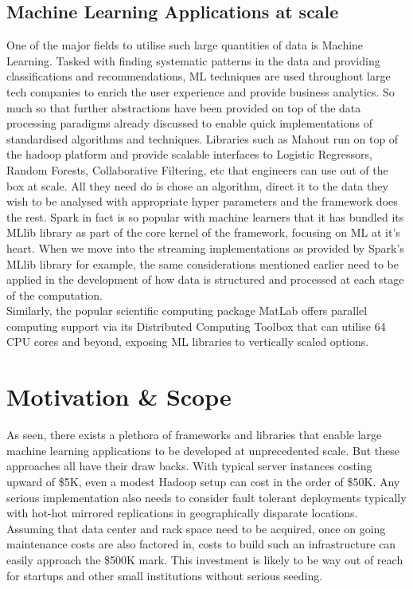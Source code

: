 \documentclass[a4paper,11pt]{scrreprt}
\begin{document}
\section{Machine Learning Applications at scale}
One of the major fields to utilise such large quantities of data is Machine Learning. Tasked with finding systematic patterns in the data and providing classifications and recommendations, ML techniques are used throughout large tech companies to enrich the user experience and provide business analytics. So much so that further abstractions have been provided on top of the data processing paradigms already discussed to enable quick implementations of standardised algorithms and techniques. Libraries such as Mahout\cite{mahout-site} run on top of the hadoop platform and provide scalable interfaces to Logistic Regressors, Random Forests, Collaborative Filtering, etc that engineers can use out of the box at scale. All they need do is chose an algorithm, direct it to the data they wish to be analysed with appropriate hyper parameters and the framework does the rest. Spark in fact is so popular with machine learners that it has bundled its MLlib library as part of the core kernel of the framework, focusing on ML at it's heart. When we move into the streaming implementations as provided by Spark's MLlib library for example, the same considerations mentioned earlier need to be applied in the development of how data is structured and processed at each stage of the computation.\\

Similarly, the popular scientific computing package MatLab offers parallel computing support via its Distributed Computing Toolbox that can utilise 64 CPU cores and beyond, exposing ML libraries to vertically scaled options.

\chapter{Motivation \& Scope}
As seen, there exists a plethora of frameworks and libraries that enable large machine learning applications to be developed at unprecedented scale. But these approaches all have their draw backs. With typical server instances costing upward of \$5K, even a modest Hadoop setup can cost in the order of \$50K. Any serious implementation also needs to consider fault tolerant deployments typically with hot-hot mirrored replications in geographically disparate locations. Assuming that data center and rack space need to be acquired, once on going maintenance costs are also factored in, costs to build such an infrastructure can easily approach the \$500K mark. This investment is likely to be way out of reach for startups and other small institutions without serious seeding.
\end{document}
